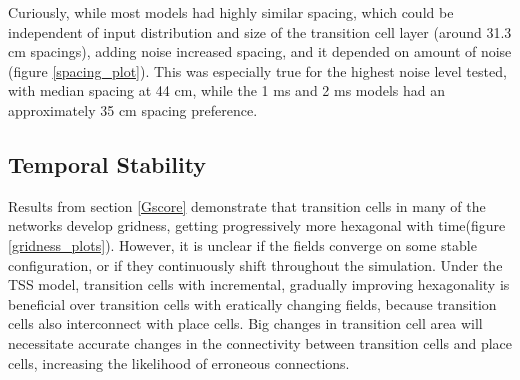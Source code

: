 \documentclass{article}
\begin{document}
    Curiously, while most models had highly similar spacing, which could be independent of input distribution and size of the transition cell layer (around 31.3 cm spacings), adding noise increased spacing, and it depended on amount of noise (figure \ref{spacing_plot}). This was especially true for the highest noise level tested, with median spacing at 44 cm, while the 1 ms and 2 ms models had an approximately 35 cm spacing preference.

    \subsection{Temporal Stability} \label{TempStab}

    Results from section \ref{Gscore} demonstrate that transition cells in many of the networks develop gridness, getting progressively more hexagonal with time(figure \ref{gridness_plots}). However, it is unclear if the fields converge on some stable configuration, or if they continuously shift throughout the simulation. Under the TSS model, transition cells with incremental, gradually improving hexagonality is beneficial over transition cells with eratically changing fields, because transition cells also interconnect with place cells. Big changes in transition cell area will necessitate accurate changes in the connectivity between transition cells and place cells, increasing the likelihood of erroneous connections.
\end{document}
